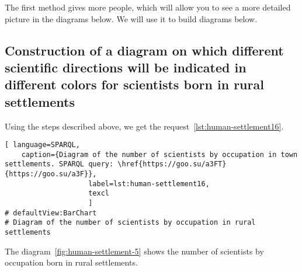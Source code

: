 The first method gives more people, which will allow you to see a more detailed picture in the diagrams below. We will use it to build diagrams below.

\subsection{Construction of a diagram on which different scientific directions will be indicated in different colors for scientists born in rural settlements}

Using the steps described above, we get the request~\protect\ref{lst:human-settlement16}.


\begin{lstlisting}[ language=SPARQL, 
    caption={Diagram of the number of scientists by occupation in town settlements. SPARQL query: \href{https://goo.su/a3FT}{https://goo.su/a3F}},
                    label=lst:human-settlement16,
                    texcl 
                    ]
# defaultView:BarChart
# Diagram of the number of scientists by occupation in rural settlements

\end{lstlisting}%

The diagram~\ref{fig:human-settlement-5} shows the number of scientists by occupation
born in rural settlements.

\begin{figure*}
    \setlength{\fboxsep}{0pt}%
    \setlength{\fboxrule}{1pt}%
	\label{fig:human-settlement-5}
	\caption[Diagram of the number of scientists by occupation in rural settlements.]{Diagram of the number of scientists by occupation in rural settlements. SPARQL query: \href{https://goo.su/a3FT}{https://goo.su/a3F}}%
\end{figure*} 

